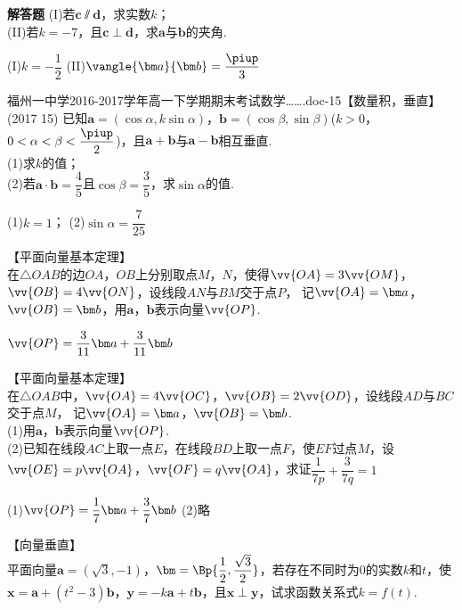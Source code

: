 \begin{exercise}{\bf 解答题}
      (I)若$\bm c\varparallel\bm d$，求实数$k$；\\
      (II)若$k=-7$，且$\bm c\perp\bm d$，求$\bm a$与$\bm b$的夹角.
      \begin{answer}
        (I)$k=-\dfrac12$
        (II)$\vangle{\bm a}{\bm b}=\dfrac{\piup}3$
      \end{answer}
    \item 福州一中学2016-2017学年高一下学期期末考试数学…….doc-15【数量积，垂直】\\
      (2017  15)
      已知$\bm a=(\cos\alpha,k\sin\alpha)$，$\bm b=(\cos\beta,\sin\beta)$($k>0$，$0<\alpha<\beta<\dfrac{\piup}2$)，且$\bm a+\bm b$与$\bm a-\bm b$相互垂直.\\
      (1)求$k$的值；\\
      (2)若$\bm a\cdot\bm b=\dfrac45$且$\cos\beta=\dfrac35$，求$\sin\alpha$的值.
      \begin{answer}
        (1)$k=1$；
        (2)$\sin\alpha=\dfrac7{25}$
      \end{answer}
    \item 【平面向量基本定理】\\
      在$\triangle{OAB}$的边$OA$，$OB$上分别取点$M$，$N$，使得$\vv{OA}=3\vv{OM}$，$\vv{OB}=4\vv{ON}$，设线段$AN$与$BM$交于点$P$，
      记$\vv{OA}=\bm a$，$\vv{OB}=\bm b$，用$\bm a$，$\bm b$表示向量$\vv{OP}$.
      \begin{answer}
        $\vv{OP}=\dfrac3{11}\bm a+\dfrac3{11}\bm b$
      \end{answer}
    \item 【平面向量基本定理】\\
      在$\triangle{OAB}$中，$\vv{OA}=4\vv{OC}$，$\vv{OB}=2\vv{OD}$，设线段$AD$与$BC$交于点$M$，
      记$\vv{OA}=\bm a$，$\vv{OB}=\bm b$.\\
      (1)用$\bm a$，$\bm b$表示向量$\vv{OP}$.\\
      (2)已知在线段$AC$上取一点$E$，在线段$BD$上取一点$F$，使$EF$过点$M$，设$\vv{OE}=p\vv{OA}$，$\vv{OF}=q\vv{OA}$，求证$\dfrac1{7p}+\dfrac3{7q}=1$
      \begin{answer}
        (1)$\vv{OP}=\dfrac17\bm a+\dfrac37\bm b$
        (2)略
      \end{answer}
    \item 【向量垂直】\\
      平面向量$\bm a=(\sqrt{3},-1)$，$\bm=\Bp{\dfrac12,\dfrac{\sqrt3}2}$，若存在不同时为0的实数$k$和$t$，使$\bm x=\bm a+(t^2-3)\bm b$，$\bm y=-k\bm a+t\bm b$，且$\bm x\perp\bm y$，试求函数关系式$k=f(t)$.
      \begin{answer}

\end{answer}
\end{exercise}
